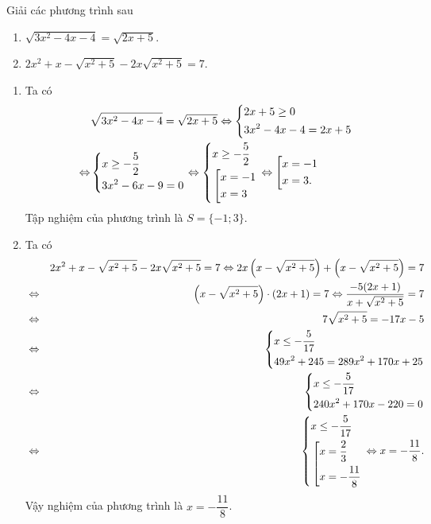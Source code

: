 \begin{bt}%
	Giải các phương trình sau
	\begin{multicols}{2}
		\begin{enumerate}
			\item $\sqrt{3x^2-4x-4} = \sqrt{2x+5}$.
			\item $2x^2 + x - \sqrt{x^2 + 5} - 2x \sqrt{x^2 + 5} = 7$.
		\end{enumerate}
	\end{multicols}
	\loigiai 
	{
		\begin{enumerate}
			\item Ta có
			\begin{align*}
			&\sqrt{3x^2-4x-4} = \sqrt{2x+5} \Leftrightarrow \left\{\begin{aligned}&2x+5 \ge 0 \\ &3x^2-4x-4 = 2x+5\end{aligned}\right. \\
			\Leftrightarrow &\left\{\begin{aligned}&x \ge -\dfrac{5}{2} \\ &3x^2 - 6x - 9 = 0\end{aligned}\right. \Leftrightarrow \left\{\begin{aligned}&x \ge -\dfrac{5}{2}\\ &\left[\begin{aligned}&x = -1 \\ &x = 3\end{aligned}\right.\end{aligned}\right. \Leftrightarrow \left[\begin{aligned}&x=-1 \\ &x=3.\end{aligned}\right.
			\end{align*}
			Tập nghiệm của phương trình là $S=\{-1;3\}.$
			\item Ta có
			\begin{eqnarray*}
				& &2x^2 + x - \sqrt{x^2 + 5} - 2x \sqrt{x^2 + 5} = 7 \Leftrightarrow 2x \left(x - \sqrt{x^2+5}\right) + \left(x - \sqrt{x^2 + 5}\right) = 7 \\
				&\Leftrightarrow &\left(x - \sqrt{x^2 + 5}\right) \cdot (2x+1)=7 \Leftrightarrow \dfrac{-5(2x+1)}{x + \sqrt{x^2+5}} = 7\\
				&\Leftrightarrow &7\sqrt{x^2 + 5} = -17x - 5 \\
				&\Leftrightarrow &\left\{\begin{aligned}&x \le -\dfrac{5}{17} \\ &49x^2 + 245 = 289x^2 + 170x + 25\end{aligned}\right. \\
				&\Leftrightarrow &\left\{\begin{aligned}&x \le -\dfrac{5}{17} \\ &240x^2 + 170x - 220 = 0\end{aligned}\right.\\
				&\Leftrightarrow &\left\{\begin{aligned}&x \le -\dfrac{5}{17} \\ &\left[\begin{aligned}&x = \dfrac{2}{3} \\ &x = -\dfrac{11}{8}\end{aligned}\right.\end{aligned}\right. \Leftrightarrow x = -\dfrac{11}{8}.
			\end{eqnarray*}
			Vậy nghiệm của phương trình là $x=-\dfrac{11}{8}$.
		\end{enumerate}
	}
\end{bt}

